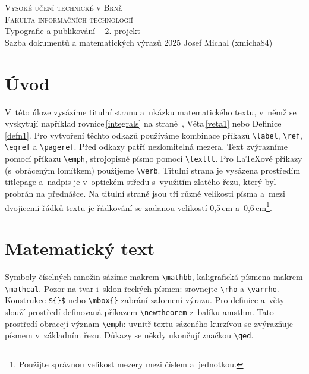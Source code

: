 \documentclass[twocolumn, a4paper, 11pt]{article}
\begin{document}
\begin{titlepage}
    \onecolumn
    
    \begin{center}
        \Huge
        \textsc{Vysoké učení technické v Brně}\\
        \vspace{0.5em}
        {\fontsize{21pt}{24pt}\selectfont
        \textsc{Fakulta informačních technologií\\}}
        \vspace{0.382\textheight}
        {\fontsize{21pt}{24pt}\selectfont
        Typografie a publikování -- 2. projekt\\
        \vspace{0.6em}
        Sazba dokumentů a matematických výrazů}
        \vfill
        {\LARGE 2025 \hfill Josef Michal (xmicha84)}
    \end{center}
    
\end{titlepage}
\twocolumn
{}

\section*{Úvod} \label{introduction}
V~této úloze vysázíme titulní stranu a~ukázku matematického textu, v~němž se vyskytují například rovnice\,\eqref{integrals} na straně~\pageref{integrals}, Věta\,\ref{veta1} nebo Definice\,\ref{defn1}.
Pro vytvoření těchto odkazů používáme kombinace příkazů \verb|\label|, \verb|\ref|, \verb|\eqref| a \verb|\pageref|.
Před odkazy patří nezlomitelná mezera. Text zvýrazníme pomocí příkazu \verb|\emph|, 
strojopisné písmo pomocí \verb|\texttt|.
Pro \LaTeX ové příkazy (s~obráceným lomítkem) použijeme \verb|\verb|.
Titulní strana je vysázena prostředím titlepage a~nadpis je v~optickém středu
s~využitím zlatého řezu, který byl probrán na přednášce.
Na titulní straně jsou tři různé velikosti písma a~mezi dvojicemi řádků textu
je řádkování se zadanou  velikostí 0,5\,em a~0,6\,em\footnote{Použijte správnou velikost mezery mezi číslem a~jednotkou.}.
\section{Matematický text} \label{mathtext}
Symboly číselných množin sázíme makrem \verb|\mathbb|,
kaligrafická písmena  makrem \verb|\mathcal|.
Pozor na tvar i~sklon řeckých písmen: srovnejte \verb|\rho| a \verb|\varrho|.
Konstrukce \verb|${}$| nebo \verb|\mbox{}| zabrání zalomení výrazu.
Pro definice a~věty slouží prostředí definovaná příkazem \verb|\newtheorem| z~balíku amsthm.
Tato prostředí obracejí význam \verb|\emph|:
uvnitř textu sázeného kurzívou se zvýrazňuje písmem v~základním řezu.
Důkazy se někdy ukončují značkou \verb|\qed|.
\end{document}
